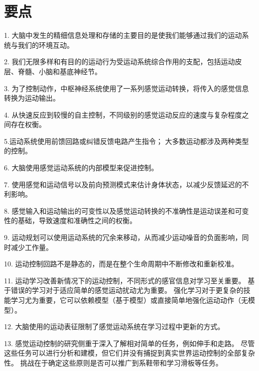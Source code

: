 \section{要点}

1. 大脑中发生的精细信息处理和存储的主要目的是使我们能够通过我们的运动系统与我们的环境互动。


2. 我们无限多样和有目的的运动行为受运动系统综合作用的支配，包括运动皮层、脊髓、小脑和基底神经节。


3. 为了控制动作，中枢神经系统使用了一系列感觉运动转换，将传入的感觉信息转换为运动输出。


4. 从快速反应到较慢的自主控制，不同级别的感觉运动反应的速度与复杂程度之间存在权衡。


5.运动系统使用前馈回路或纠错反馈电路产生指令；
大多数运动都涉及两种类型的控制。


6. 大脑使用感觉运动系统的内部模型来促进控制。


7. 使用感觉和运动信号以及前向预测模式来估计身体状态，以减少反馈延迟的不利影响。


8. 感觉输入和运动输出的可变性以及感觉运动转换的不准确性是运动误差和可变性的基础，导致速度和准确性之间的权衡。


9. 运动规划可以使用运动系统的冗余来移动，从而减少运动噪音的负面影响，同时减少工作量。


10. 运动控制回路不是静态的，而是在整个生命周期中不断修改和重新校准。


11. 运动学习改善新情况下的运动控制，不同形式的感官信息对学习至关重要。
基于错误的学习对于适应简单的感觉运动扰动尤为重要。
强化学习对于更复杂的技能学习尤为重要，它可以依赖模型（基于模型）或直接简单地强化运动动作（无模型）。


12. 大脑使用的运动表征限制了感觉运动系统在学习过程中更新的方式。


13. 感觉运动控制的研究侧重于深入了解相对简单的任务，例如伸手和走路。
尽管这些任务可以进行分析和建模，但它们并没有捕捉到真实世界运动控制的全部复杂性。
挑战在于确定这些原则是否可以推广到系鞋带和学习滑板等任务。


